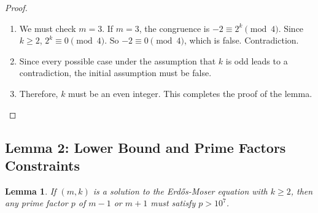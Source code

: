 \documentclass[11pt,a4paper]{article}
\newtheorem{lemma}{Lemma}
\begin{document}
\begin{proof}
\begin{enumerate}
    \item We must check $m=3$. If $m=3$, the congruence is $-2 \equiv 2^k \pmod 4$. Since $k \ge 2$, $2^k \equiv 0 \pmod 4$. So $-2 \equiv 0 \pmod 4$, which is false. Contradiction.
    \item Since every possible case under the assumption that $k$ is odd leads to a contradiction, the initial assumption must be false.
    \item Therefore, $k$ must be an even integer. This completes the proof of the lemma.
\end{enumerate}
\end{proof}

\subsection{Lemma 2: Lower Bound and Prime Factors Constraints}

\begin{lemma}
If $(m, k)$ is a solution to the Erd\H{o}s-Moser equation with $k \ge 2$, then any prime factor $p$ of $m-1$ or $m+1$ must satisfy $p > 10^7$.
\end{lemma}
\end{document}
